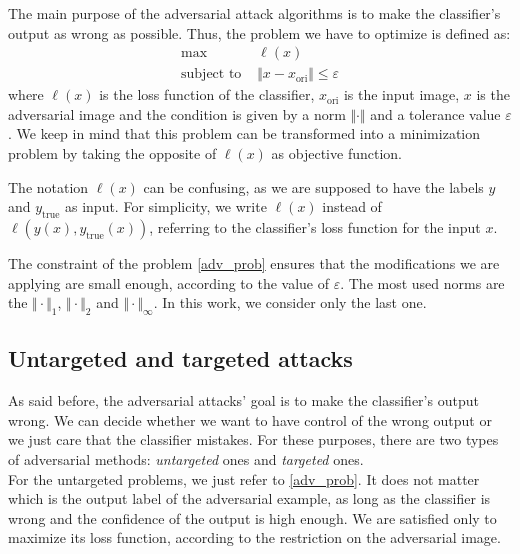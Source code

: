 \documentclass[10pt,twocolumn,letterpaper, english]{article}
\theoremstyle{definition}
\theoremstyle{plain}
\theoremstyle{plain}
\theoremstyle{plain}
\theoremstyle{plain}
\theoremstyle{remark}
\theoremstyle{remark}
\theoremstyle{definition}
\theoremstyle{definition}
\theoremstyle{definition}
\theoremstyle{definition}
\renewcommand{\epsilon}{\varepsilon}
\begin{document}
The main purpose of the adversarial attack algorithms is to make the classifier's output as wrong as possible. 
Thus, the problem we have to optimize is defined as: 
\begin{align}
    \max \, &\ell(x) \label{adv_prob} \\
    \text{subject to } & \Vert x - x_{\text{ori}} \Vert \le \epsilon \nonumber
\end{align}
where $\ell(x)$ is the loss function of the classifier, $x_{\text{ori}}$ is the input image, $x$ is the adversarial image and the condition is given by a norm $\Vert \cdot \Vert$ and a tolerance value $\epsilon$. 
We keep in mind that this problem can be transformed into a minimization problem by taking the opposite of $\ell(x)$ as objective function. 

The notation $\ell(x)$ can be confusing, as we are supposed to have the labels $y$ and $y_{\text{true}}$ as input. 
For simplicity, we write $\ell(x)$ instead of $\ell(y(x), y_{\text{true}}(x))$, referring to the classifier's loss function for the input $x$. 

The constraint of the problem \ref{adv_prob} ensures that the modifications we are applying are small enough, according to the value of $\epsilon$. 
The most used norms are the $\Vert \cdot \Vert_1$, $\Vert \cdot \Vert_2$ and $\Vert \cdot \Vert_{\infty}$. 
In this work, we consider only the last one. 

\subsection{Untargeted and targeted attacks} 

As said before, the adversarial attacks' goal is to make the classifier's output wrong. 
We can decide whether we want to have control of the wrong output or we just care that the classifier mistakes. 
For these purposes, there are two types of adversarial methods: \textit{untargeted} ones and \textit{targeted} ones. \\ 

For the untargeted problems, we just refer to \ref{adv_prob}. 
It does not matter which is the output label of the adversarial example, as long as the classifier is wrong and the confidence of the output is high enough. 
We are satisfied only to maximize its loss function, according to the restriction on the adversarial image.\\
\end{document}
